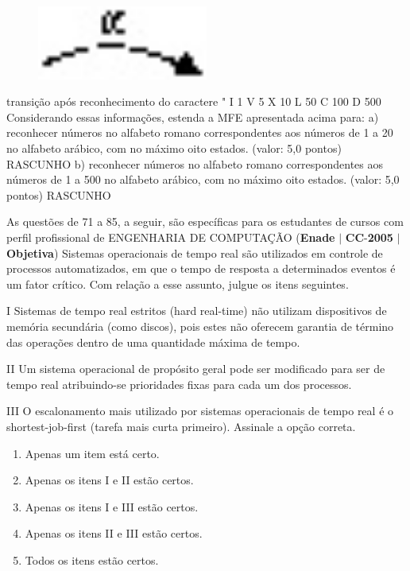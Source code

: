 \documentclass{exam}
\begin{document}
\begin{questions}
\begin{figure}[H]
	\begin{center}
		\includegraphics[width=0.5\textwidth]{CIENCIA_DA_COMPUTACAO_Prova2005-utf8_figuras/fig-0039.jpg}
	\end{center}
\end{figure}
transição após reconhecimento do caractere "
I 1
V 5
X 10
L 50
C 100
D 500
Considerando essas informações, estenda a MFE apresentada acima para:
a) reconhecer números no alfabeto romano correspondentes aos números de 1 a 20 no alfabeto arábico, com no máximo oito estados.
(valor: 5,0 pontos)
RASCUNHO
b) reconhecer números no alfabeto romano correspondentes aos números de 1 a 500 no alfabeto arábico, com no máximo oito
estados. (valor: 5,0 pontos)
RASCUNHO

As questões de 71 a 85, a seguir, são específicas para os estudantes de cursos com perfil profissional de
ENGENHARIA DE COMPUTAÇÃO
\question (\textbf{Enade} $|$ \textbf{CC}-\textbf{2005} $|$ \textbf{Objetiva})
Sistemas operacionais de tempo real são utilizados em controle
de processos automatizados, em que o tempo de resposta a
determinados eventos é um fator crítico. Com relação a esse
assunto, julgue os itens seguintes.

I Sistemas de tempo real estritos (hard real-time) não utilizam
dispositivos de memória secundária (como discos), pois estes
não oferecem garantia de término das operações dentro de
uma quantidade máxima de tempo.

II Um sistema operacional de propósito geral pode ser
modificado para ser de tempo real atribuindo-se prioridades
fixas para cada um dos processos.

III O escalonamento mais utilizado por sistemas operacionais de
tempo real é o shortest-job-first (tarefa mais curta primeiro).
Assinale a opção correta.

	\begin{enumerate}[label=\alph*)]
		\item  Apenas um item está certo.
		\item  Apenas os itens I e II estão certos.
		\item  Apenas os itens I e III estão certos.
		\item  Apenas os itens II e III estão certos.
		\item  Todos os itens estão certos.
	\end{enumerate}


\end{questions}
\end{document}
